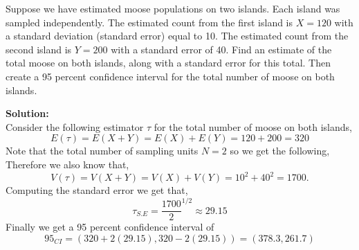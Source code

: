 \documentclass[12pt]{article}
\makeatletter
\theoremstyle{homework}
\newenvironment{exercise}[1]
{\def\@currentlabel{#1}\exercisecore}
{\endexercisecore}
\newcommand{\localhead}[1]{\par\smallskip\noindent\textbf{#1}\nobreak\\}%
\newcommand\solution{\localhead{Solution:}}
\makeatother
\begin{document}
\vspace{1in}

\begin{exercise}{5}Suppose we have estimated moose populations on two islands.
    Each island was sampled independently.  The estimated count from the first island is $X = 120$ with a 
    standard deviation (standard error) equal to 10.  The estimated count from the second island is $Y = 200$ with a standard error of 40.  
    Find an estimate of the total moose on both islands, along with a standard error for this total. 
    Then create a 95 percent confidence interval for the total number of moose on both islands.\\
    \solution  Consider the following estimator $\tau$ for the total number of moose on both islands,
    \begin{equation*}
        E(\tau) = E(X + Y) = E(X) + E(Y) = 120 + 200 = 320 
    \end{equation*}
    Note that the total number of sampling units $N = 2$ so we get the following,
   Therefore we also know that, 
    \begin{equation*}
        V(\tau) = V(X + Y) = V(X) + V(Y) = 10^2 + 40^2 = 1700.
    \end{equation*}
    Computing the standard error we get that, 
    \begin{equation*}
        \tau_{S.E} = \frac{1700}{2}^{1/2} \approx 29.15
    \end{equation*}
    Finally we get a 95 percent confidence interval of 
    \begin{equation*}
        95_{CI} = (320 + 2(29.15), 320 - 2(29.15)) = (378.3, 261.7)
    \end{equation*}
\end{exercise}
\end{document}
